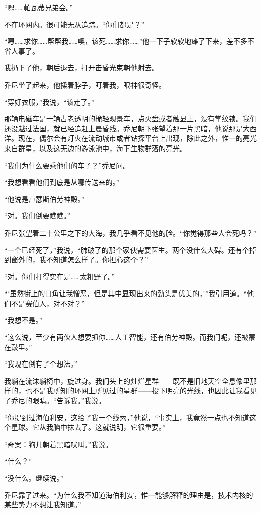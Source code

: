 \documentclass[AutoFakeBold=true]{book}
\begin{document}
``嗯……帕瓦蒂兄弟会。''

不在环网内。很可能无从追踪。``你们都是？''

``嗯……求你……帮帮我……噢，该死……求你……''他一下子软软地瘫了下来，差不多不省人事了。

我扔下了他，朝后退去，打开击昏光束朝他射去。

乔尼坐了起来，他揉着脖子，盯着我，眼神很奇怪。

``穿好衣服，''我说，``该走了。''

\vspace*{1em}

那辆电磁车是一辆古老透明的桅轻观景车，点火盘或者触显上，没有掌纹锁。我们还没越过法国，就已经追赶上晨昏线。乔尼朝下张望着那一片黑暗，他说那是大西洋。现在，偶尔会有灯火在流动城市或者钻探平台上出现，除此之外，惟一的亮光来自群星，以及这无边的游泳池中，海下生物群落的亮光。

``我们为什么要乘他们的车子？''乔尼问。

``我想看看他们到底是从哪传送来的。''

``他说是卢瑟斯伯劳神殿。''

``对。我们倒要瞧瞧。''

乔尼张望着二十公里之下的大海，我几乎看不见他的脸。``你觉得那些人会死吗？''

``一个已经死了，''我说，``肺破了的那个家伙需要医生。两个没什么大碍。还有个掉到窗外的，我不知道怎么样了。你担心这个？''

``对。你们打得实在是……太粗野了。''

```虽然街上的口角让我憎恶，但是其中显现出来的劲头是优美的，'''我引用道。``他们不是赛伯人，对不对？''

``我想不是。''

``这么说，至少有两伙人想要抓你……人工智能，还有伯劳神殿。而我们呢，还被蒙在鼓里。''

``我现在倒有了个想法。''

我躺在流沫躺椅中，旋过身。我们头上的灿烂星群——既不是旧地天空全息像里那样的，也不是我所知的环网上所见过的星群——投下明亮的光线，也因此让我看见了乔尼的眼睛。``告诉我。''我说。

``你提到过海伯利安，这给了我一个线索，''他说，``事实上，我竟然一点也不知道这个星球。它从我脑中抹去了。这就说明，它很重要。''

``奇案：狗儿朝着黑暗吠叫。''我说。

``什么？''

``没什么。继续说。''

乔尼靠了过来。``为什么我不知道海伯利安，惟一能够解释的理由是，技术内核的某些势力不想让我知道。''
\end{document}
